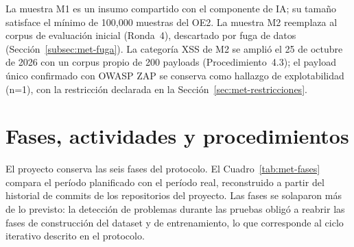 La muestra M1 es un insumo compartido con el componente de IA; su tamaño satisface el mínimo de
100{,}000 muestras del OE2. La muestra M2 reemplaza al corpus de evaluación inicial (Ronda~4),
descartado por fuga de datos (Sección~\ref{subsec:met-fuga}). La categoría XSS de M2 se amplió el 25 de octubre de 2026 con un corpus propio de 200 payloads
(Procedimiento~4.3); el payload único confirmado con OWASP ZAP se conserva como hallazgo de
explotabilidad (n=1), con la restricción declarada en la Sección~\ref{sec:met-restricciones}.

\section{Fases, actividades y procedimientos}
\label{sec:met-fases}

El proyecto conserva las seis fases del protocolo. El Cuadro~\ref{tab:met-fases} compara el
período planificado con el período real, reconstruido a partir del historial de commits de los
repositorios del proyecto. Las fases se solaparon más de lo previsto: la detección de problemas
durante las pruebas obligó a reabrir las fases de construcción del dataset y de entrenamiento,
lo que corresponde al ciclo iterativo descrito en el protocolo.

